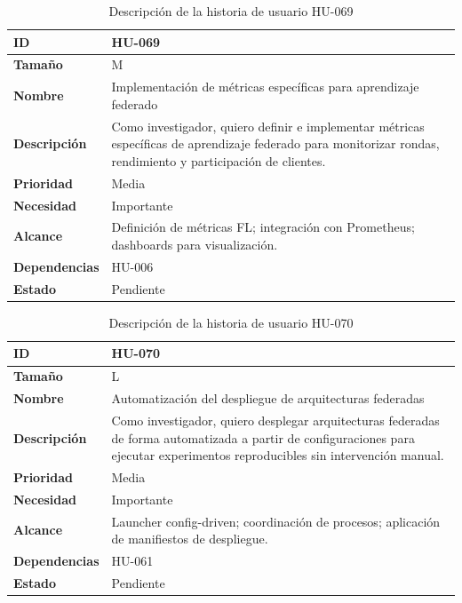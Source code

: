 \documentclass{report}
\begin{document}
\begin{table}[H]
\centering
\caption{Descripción de la historia de usuario HU-069}
\label{tab:hu069}
\begin{tabular}{|l|p{12cm}|}
\hline
\textbf{ID} & HU-069\\ \hline
\textbf{Tamaño} & M \\ \hline
\textbf{Nombre} & Implementación de métricas específicas para aprendizaje federado \\ \hline
\textbf{Descripción} &
Como investigador, quiero definir e implementar métricas específicas de aprendizaje federado para monitorizar rondas, rendimiento y participación de clientes. \\ \hline
\textbf{Prioridad} & Media \\ \hline
\textbf{Necesidad} & Importante \\ \hline
\textbf{Alcance} &
Definición de métricas FL; integración con Prometheus; dashboards para visualización. \\ \hline
\textbf{Dependencias} & HU-006 \\ \hline
\textbf{Estado} & Pendiente \\ \hline
\end{tabular}
\end{table}


\begin{table}[H]
\centering
\caption{Descripción de la historia de usuario HU-070}
\label{tab:hu070}
\begin{tabular}{|l|p{12cm}|}
\hline
\textbf{ID} & HU-070 \\ \hline
\textbf{Tamaño} & L \\ \hline
\textbf{Nombre} & Automatización del despliegue de arquitecturas federadas \\ \hline
\textbf{Descripción} &
Como investigador, quiero desplegar arquitecturas federadas de forma automatizada a partir de configuraciones para ejecutar experimentos reproducibles sin intervención manual. \\ \hline
\textbf{Prioridad} & Media \\ \hline
\textbf{Necesidad} & Importante \\ \hline
\textbf{Alcance} &
Launcher config-driven; coordinación de procesos; aplicación de manifiestos de despliegue. \\ \hline
\textbf{Dependencias} & HU-061 \\ \hline
\textbf{Estado} & Pendiente \\ \hline
\end{tabular}
\end{table}
\end{document}
